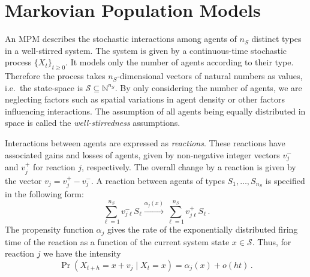 
\section{Markovian Population Models}
An \acf{MPM}
describes the stochastic interactions
among agents of $n_S$ distinct types in a well-stirred system.
The system is given by a continuous-time stochastic process $\{X_t\}_{t\geq 0}$.
It models only the number of agents according to their type.
Therefore the process takes $n_S$-dimensional vectors of natural numbers as values, i.e.\ the
state-space is $\mathcal{S}\subseteq\mathbb{N}^{n_S}$.
By only considering the number of agents, we are neglecting factors such as spatial variations
in agent density or other factors influencing interactions.
The assumption of all agents being equally distributed in space is called the \emph{well-stirredness}
assumptions.

Interactions between agents are expressed as \emph{reactions}.
These reactions have associated
gains and losses of agents, given by non-negative integer vectors   
${v}_j^{-}$ and ${v}_j^{+}$ for reaction $j$, respectively. The overall change by a reaction is given by the vector $v_j = v_j^+ - v_j^-$.
A reaction between agents of types $S_1,\dots, S_{n_S}$ is specified in the following form:
\begin{equation}\label{eq:reaction}
    \sum_{\ell=1}^{n_S} v_{j\ell}^{-} S_\ell
    \xrightarrow{\alpha_j( x)}
    \sum_{\ell=1}^{n_S} v_{j\ell}^{+} S_\ell\,.
\end{equation}
The propensity function $\alpha_j$ gives the rate of the exponentially distributed firing
time of the reaction as a function of the current system state $x\in \mathcal{S}$.
Thus, for reaction $j$ we have the intensity
\begin{equation}\label{eq:firing}
	\Pr\left(X_{t+h}=x+v_j\mid X_{t}=x\right)
	=
	\alpha_j(x) + o(h t)\,.
\end{equation}


